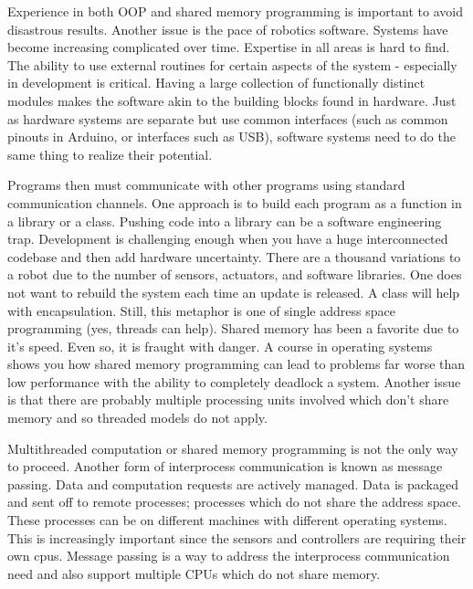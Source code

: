 Experience in both OOP and shared memory programming is important to
avoid disastrous results. Another issue is the pace of robotics
software. Systems have become increasing complicated over time.
Expertise in all areas is hard to find. The ability to use external
routines for certain aspects of the system - especially in development
is critical. Having a large collection of functionally distinct modules
makes the software akin to the building blocks found in hardware. Just
as hardware systems are separate but use common interfaces (such as
common pinouts in Arduino, or interfaces such as USB), software systems
need to do the same thing to realize their potential.

Programs then must communicate with other programs using standard
communication channels. One approach is to build each program as a
function in a library or a class. Pushing code into a library can be a
software engineering trap. Development is challenging enough when you
have a huge interconnected codebase and then add hardware uncertainty.
There are a thousand variations to a robot due to the number of sensors,
actuators, and software libraries. One does not want to rebuild the
system each time an update is released. A class will help with
encapsulation. Still, this metaphor is one of single address space
programming (yes, threads can help). Shared memory has been a favorite
due to it's speed. Even so, it is fraught with danger. A course in
operating systems shows you how shared memory programming can lead to
problems far worse than low performance with the ability to completely
deadlock a system. Another issue is that there are probably multiple
processing units involved which don't share memory and so threaded
models do not apply.

Multithreaded computation or shared memory programming is not the only
way to proceed. Another form of interprocess communication is known as
message passing. Data and computation requests are actively managed.
Data is packaged and sent off to remote processes; processes which do
not share the address space. These processes can be on different
machines with different operating systems. This is increasingly
important since the sensors and controllers are requiring their own
cpus. Message passing is a way to address the interprocess communication
need and also support multiple CPUs which do not share memory.

